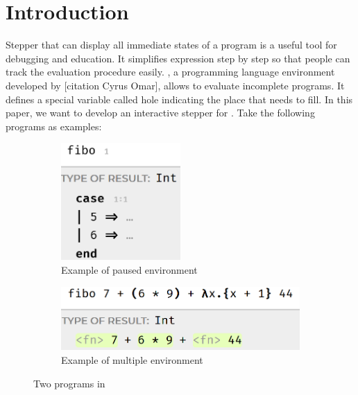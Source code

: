 \section{Introduction}

Stepper that can display all immediate states of a program is a useful tool for debugging and education. It simplifies expression step by step so that people can track the evaluation procedure easily. \Hazel, a programming language environment developed by [citation Cyrus Omar], allows to evaluate incomplete programs. It defines a special variable called hole indicating the place that needs to fill. In this paper, we want to develop an interactive stepper for \Hazel. Take the following programs as examples:

\begin{figure}[htbp]
  \centering
  \begin{subfigure}[b]{0.4\textwidth}
      \centering
      \includegraphics[width=0.5\textwidth]{img/pause_example.png}
      \caption{Example of paused environment}
      \label{fig:pause}
  \end{subfigure}
  \hfill
  \begin{subfigure}[b]{0.4\textwidth}
      \centering
      \includegraphics[width=\textwidth]{img/interactive.png}
      \caption{Example of multiple environment}
      \label{fig:multiple}
  \end{subfigure}
    \caption{Two programs in \Hazel}
    \label{fig:intro_example}
\end{figure}

